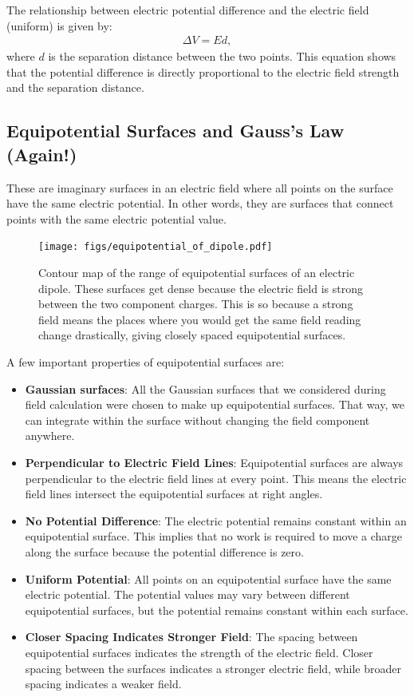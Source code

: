 \documentclass[12pt,b4paper]{article}
\begin{document}
The relationship between electric potential difference and the electric field (uniform) is given by:
\begin{align}
    \Delta V=Ed,
\end{align}
where $d$ is the separation distance between the two points. This equation shows that the potential difference is directly proportional to the electric field strength and the separation distance.
\subsection{Equipotential Surfaces and Gauss's Law (Again!)}
These are imaginary surfaces in an electric field where all points on the surface have the same electric potential. In other words, they are surfaces that connect points with the same electric potential value.
\begin{figure}[H]
    \centering
    \texttt{[image: figs/equipotential\_of\_dipole.pdf]}
    \caption{Contour map of the range of equipotential surfaces of an electric dipole. These surfaces get dense because the electric field is strong between the two component charges. This is so because a strong field means the places where you would get the same field reading change drastically, giving closely spaced equipotential surfaces.}
    \label{fig:equipotential_of_dipole}
\end{figure}
A few important properties of equipotential surfaces are:
\begin{itemize}
    \item \textbf{Gaussian surfaces}: All the Gaussian surfaces that we considered during field calculation were chosen to make up equipotential surfaces. That way, we can integrate within the surface without changing the field component anywhere.
    \item \textbf{Perpendicular to Electric Field Lines}: Equipotential surfaces are always perpendicular to the electric field lines at every point. This means the electric field lines intersect the equipotential surfaces at right angles.
    \item \textbf{No Potential Difference}: The electric potential remains constant within an equipotential surface. This implies that no work is required to move a charge along the surface because the potential difference is zero.
    \item \textbf{Uniform Potential}: All points on an equipotential surface have the same electric potential. The potential values may vary between different equipotential surfaces, but the potential remains constant within each surface.
    \item \textbf{Closer Spacing Indicates Stronger Field}: The spacing between equipotential surfaces indicates the strength of the electric field. Closer spacing between the surfaces indicates a stronger electric field, while broader spacing indicates a weaker field.
\end{itemize}
\end{document}
